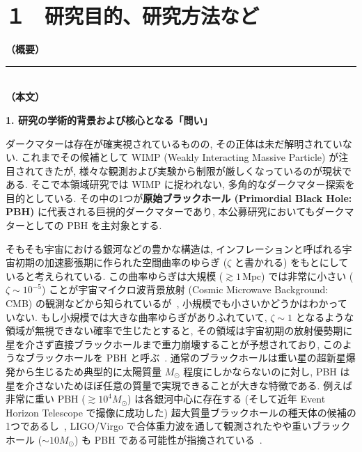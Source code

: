 \documentclass[11pt,a4paper,uplatex,dvipdfmx]{ujarticle} 		%
\newcommand{\研究課題名}{曲率ゆらぎの統計と原始ブラックホール量の精密対応}
\newcommand{\研究機関名}{名古屋大学}
\newcommand{\研究代表者氏名}{多田祐一郎}
\newcommand{\研究期間の最終元号年度}{4}  %
\renewcommand{\emph}[1]{{\sffamily\gtfamily\bfseries #1}}
\begin{document}
\mgfamily\sffamily


\section{１　研究目的、研究方法など}

\noindent
\textbf{（概要）}\\
	
	\vspace*{10zw}	%

\noindent
\rule{\linewidth}{1pt}\\
\noindent
\textbf{（本文）}

\begin{mdframed}[roundcorner=0.5zw,
	innertopmargin=0.8zw,innerbottommargin=0.8zw,
	linecolor=black!50,linewidth=0.2zw,
	backgroundcolor=black!10]
	{\bfseries\gtfamily\sffamily\large 1. 研究の学術的背景および核心となる「問い」}
\end{mdframed}

\noindent
ダークマターは存在が確実視されているものの, その正体は未だ解明されていない.
これまでその候補として WIMP (Weakly Interacting Massive Particle) が注目されてきたが, 様々な観測および実験から制限が厳しくなっているのが現状である.
そこで本領域研究では WIMP に捉われない, 多角的なダークマター探索を目的としている.
その中の1つが\emph{原始ブラックホール (Primordial Black Hole: PBH)} に代表される巨視的ダークマターであり,
本公募研究においてもダークマターとしての PBH を主対象とする.

そもそも宇宙における銀河などの豊かな構造は, インフレーションと呼ばれる宇宙初期の加速膨張期に作られた空間曲率のゆらぎ ($\zeta$ と書かれる) をもとにしていると考えられている.
この曲率ゆらぎは大規模 ($\gtrsim1\,\mathrm{Mpc}$) では非常に小さい ($\zeta\sim10^{-5}$) ことが宇宙マイクロ波背景放射 (Cosmic Microwave Background: CMB) の観測などから知られているが~\cite{Aghanim:2018eyx},
小規模でも小さいかどうかはわかっていない.
もし小規模では大きな曲率ゆらぎがありふれていて, $\zeta\sim1$ となるような領域が無視できない確率で生じたとすると, その領域は宇宙初期の放射優勢期に星を介さず直接ブラックホールまで重力崩壊することが予想されており,
このようなブラックホールを PBH と呼ぶ~\cite{Carr:1974nx}.
通常のブラックホールは重い星の超新星爆発から生じるため典型的に太陽質量 $M_\odot$ 程度にしかならないのに対し,
PBH は星を介さないためほぼ任意の質量で実現できることが大きな特徴である.
例えば非常に重い PBH ($\gtrsim10^4M_\odot$) は各銀河中心に存在する (そして近年 Event Horizon Telescope で撮像に成功した) 超大質量ブラックホールの種天体の候補の1つであるし~\cite{Carr:2018rid},
LIGO/Virgo で合体重力波を通して観測されたやや重いブラックホール ($\sim10M_\odot$) も PBH である可能性が指摘されている~\cite{Sasaki:2018dmp}.
\end{document}
